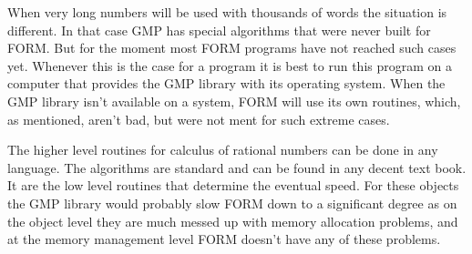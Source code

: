 When very long numbers will be used with thousands of words the situation 
is different. In that case GMP has special algorithms that were never built 
for FORM. But for the moment most FORM programs have not reached such cases 
yet. Whenever this is the case for a program it is best to run this program 
on a computer that provides the GMP library with its operating system. When 
the GMP library isn't available on a system, FORM will use its own 
routines, which, as mentioned, aren't bad, but were not ment for such 
extreme cases.

The higher level routines for calculus of rational numbers can be done in 
any language. The algorithms are standard and can be found in any decent 
text book. It are the low level routines that determine the eventual 
speed. For these objects the GMP library would probably slow FORM down to a 
significant degree as on the object level they are much messed up with 
memory allocation problems, and at the memory management level FORM doesn't 
have any of these problems.
